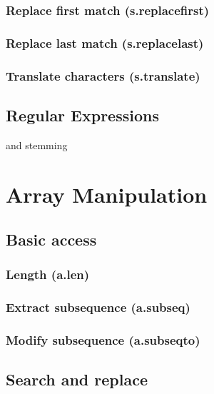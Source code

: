 \documentclass{article}
\theoremstyle{definition}
\begin{document}
\subsubsection{Replace first match (s.replacefirst)}

\subsubsection{Replace last match (s.replacelast)}

\subsubsection{Translate characters (s.translate)}

\subsection{Regular Expressions}

and stemming

\pagebreak

\section{Array Manipulation}

\subsection{Basic access}

\subsubsection{Length (a.len)}

\subsubsection{Extract subsequence (a.subseq)}

\subsubsection{Modify subsequence (a.subseqto)}

\subsection{Search and replace}
\end{document}
